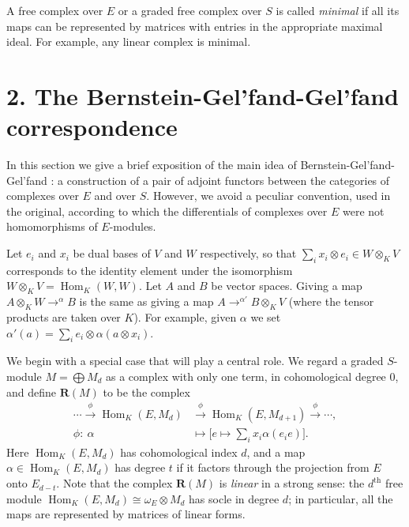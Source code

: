 \documentclass{tran-l}
\newcommand{\iso}{\cong}
\newcommand{\myHom}{\operatorname{Hom}}
\newcommand{\myth}{{\operatorname{th}}}
\newcommand{\RR}{\mathbf{R}}
\theoremstyle{plain}
\theoremstyle{remark}
\theoremstyle{definition}
\begin{document}
A free complex over $E$ or a graded free complex over $S$ is called {\em minimal\/} if all its maps can be represented by matrices with entries in
the appropriate maximal ideal. For example, any linear complex is
minimal.

\section*{2. The Bernstein-Gel'fand-Gel'fand correspondence}

In this section we give a brief exposition of the main
idea of Bernstein-Gel'fand-Gel'fand \cite{BGG}: a construction of a
pair of adjoint functors between the categories of complexes over $E$
and over $S$. However, we avoid a peculiar convention, used in the
original, according to which the differentials of complexes over $E$
were not homomorphisms of $E$-modules.

Let $e_{i}$ and $x_{i}$ be dual bases of $V$ and $W$ respectively, so that
$\sum _{i} x_{i}\otimes e_{i}\in W\otimes _{K} V$ corresponds to the identity
element under the isomorphism $W\otimes _{K} V = \myHom _{K}(W,W)$.
Let $A$ and $B$ be vector spaces. Giving a map
$A\otimes _{K} W\to ^{\alpha }B$
is the same as giving a map $A\to ^{\alpha '}B\otimes _{K} V$ (where the
tensor products are taken over $K$). For example, given $\alpha $ we
set $\alpha '(a) = \sum _{i} e_{i}\otimes \alpha (a\otimes x_{i})$.

We begin with a special case that will play a central role. We
regard a graded $S$-module $M=\bigoplus M_{d}$
as a complex with only one term, in cohomological degree 0, and
define $\RR (M)$ to be the complex
\begin{align*}
\cdots \overset {\phi }{\longrightarrow }\myHom _{K}(E, M_{d})&\overset {\phi
}{\longrightarrow }\myHom _{K}(E, M_{d+1})\overset {\phi }{\longrightarrow
}\cdots, \\
\phi :\ \alpha &\mapsto \bigl [ e\mapsto \sum _{i}
x_{i}\alpha (e_{i}e)\bigr ]. 
\end{align*}
Here $\myHom _{K}(E,M_{d})$ has cohomological index $d$, and a map
$\alpha \in \myHom _{K}(E, M_{d})$ has degree $t$ if it factors through the
projection from $E$ onto $E_{d-t}$. Note that the complex
$\RR (M)$ is {\em linear\/} in a strong sense:
the $d^{\myth }$ free module $\myHom _{K}(E, M_{d})\iso \omega _{E}\otimes M_{d}$
has socle in degree $d$;
in particular, all the maps are represented by matrices of linear
forms.
\end{document}
